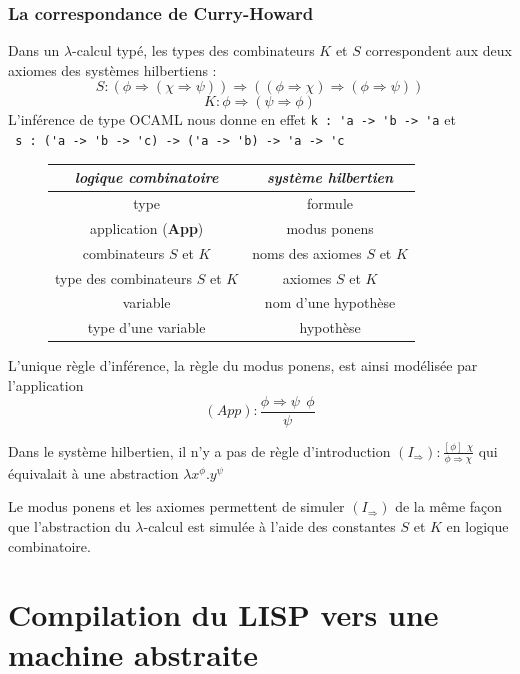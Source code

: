 \documentclass[11pt]{book}
\begin{document}
\subsubsection{La correspondance de Curry-Howard}
Dans un $\lambda$-calcul typé, les types des combinateurs $K$ et $S$ correspondent aux deux axiomes
des systèmes hilbertiens :
$$ S : (\phi \Rightarrow (\chi \Rightarrow \psi)) \Rightarrow ((\phi \Rightarrow \chi) \Rightarrow(\phi \Rightarrow \psi)) 
$$
$$   K : \phi \Rightarrow (\psi \Rightarrow \phi)
$$
L'inférence de type OCAML nous donne en effet 
\verb+k : 'a -> 'b -> 'a+ et  \\ 
\verb+ s : ('a -> 'b -> 'c) -> ('a -> 'b) -> 'a -> 'c+
\begin{center}
\begin{figure}[H]
	\begin{tabular}{|c|c|} \hline
		\textit{logique combinatoire} & \textit{système hilbertien} \\ \hline
		type & formule \\
		application (\textbf{App}) & modus ponens \\
		combinateurs $S$ et $K$ & noms des axiomes $S$ et $K$ \\
		type des combinateurs $S$ et $K$ & axiomes $S$ et $K$ \\
		variable & nom d'une hypothèse \\
		type d'une variable & hypothèse \\ \hline
	\end{tabular}	
\end{figure}
\end{center}

L'unique règle d'inférence, la règle du modus ponens, est ainsi modélisée par l'application
$$ (App) : \frac{\phi \Rightarrow \psi \ \ \phi}{\psi} $$

Dans le système hilbertien, il n'y a pas de règle d'introduction 
$(I_\Rightarrow) : \frac{[\phi]\ \ \chi}{\phi \Rightarrow \chi}$ qui équivalait à une abstraction 
$\lambda x^\phi.y^\psi $

Le modus ponens et les axiomes permettent de simuler $(I_\Rightarrow )$ de la même façon que 
l'abstraction du $\lambda$-calcul est simulée à l'aide des constantes $S$ et $K$ en logique combinatoire.

\section{Compilation du LISP vers une machine abstraite}
\end{document}
